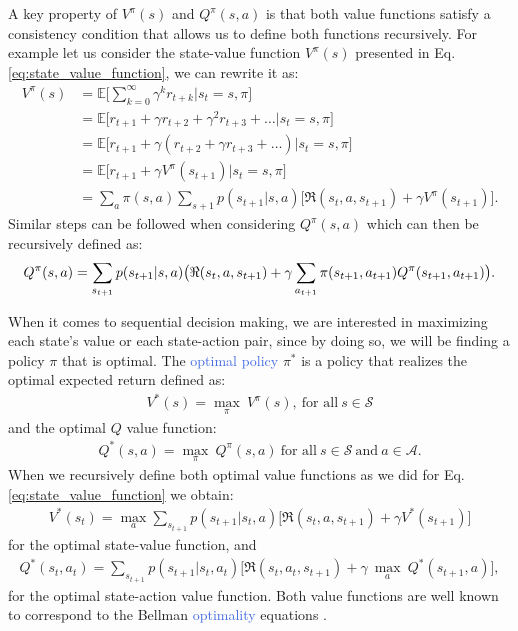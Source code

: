 A key property of $V^{\pi}(s)$ and $Q^{\pi}(s,a)$ is that both value functions satisfy a consistency condition that allows us to define both functions recursively. For example let us consider the state-value function $V^{\pi}(s)$ presented in Eq. \ref{eq:state_value_function}, we can rewrite it as:
\begin{equation}
\begin{split}
 V^{\pi}(s) & =\mathds{E}\big[\sum_{k=0}^{\infty}\gamma^{k}r_{t+k}\big| s_t = s, \pi \big] \\ 
 & =\mathds{E}\big[r_{t+1}+\gamma r_{t+2}+\gamma^{2}r_{t+3}+\ldots \big| s_t =s , \pi \big] \\ 
 & =\mathds{E}\big[r_{t+1}+\gamma(r_{t+2}+\gamma r_{t+3}+\ldots)\big| s_t =s , \pi \big] \\
 & =\mathds{E}\big[r_{t+1}+\gamma V^{\pi}(s_{t+1}) \big| s_t =s , \pi \big] \\
 & =\sum_a \pi(s,a) \sum_{s+1} p(s_{t+1}|s,a)\big[\Re(s_t, a, s_{t+1}) + \gamma V^{\pi}(s_{t+1}) \big].
\end{split}
\end{equation}
Similar steps can be followed when considering $Q^{\pi}(s,a)$ which can then be recursively defined as:
\begin{equation}
	Q^{\pi}(s,a) = \sum_{s_{t+1}} p(s_{t+1}|s,a)\big(\Re(s_t, a, s_{t+1}) + \\ \gamma \sum_{a_{t+1}} \pi(s_{t+1},a_{t+1}) Q^{\pi}(s_{t+1}, a_{t+1}) \big).
\end{equation}

When it comes to sequential decision making, we are interested in maximizing each state's value or each state-action pair, since by doing so, we will be finding a policy $\pi$ that is optimal. The \textcolor{RoyalBlue}{optimal policy} $\pi^{*}$ is a policy that realizes the optimal expected return defined as:
\begin{align}
 V^{*}(s)=\underset{\pi}{\max}\:V^{\pi}(s), \ \text{for all} \ s\in\mathcal{S}
\end{align}
and the optimal $Q$ value function:
\begin{align}
Q^{*}(s,a)= \underset{\pi}{\max}\:Q^{\pi}(s,a) \ \text{for all} \ s\in\mathcal{S} \ \text{and} \ a \in\mathcal{    A}.
\end{align}
When we recursively define both optimal value functions as we did for Eq. \ref{eq:state_value_function} we obtain:
\begin{align}
    V^{*}(s_t) = \underset{a}{\max}\sum_{s_{t+1}}p(s_{t+1} | s_{t}, a) \bigg[\Re (s_{t}, a, s_{t+1}) + \gamma V^{*}(s_{t+1}) \bigg]
    \label{eq:optimal_v}
\end{align}
for the optimal state-value function, and
\begin{multline}
    Q^{*}(s_t,a_t)=\sum_{s_{t+1}}p(s_{t+1} | s_{t}, a_{t})  \bigg[\Re (s_{t}, a_{t}, s_{t+1}) + \gamma \: \underset{a}{\max} \: Q^{*}(s_{t+1}, a) \bigg],
    \label{eq:optimal_q}
\end{multline}
for the optimal state-action value function. Both value functions are well known to correspond to the Bellman \textcolor{RoyalBlue}{optimality} equations \cite{bellman1966dynamic}. 

